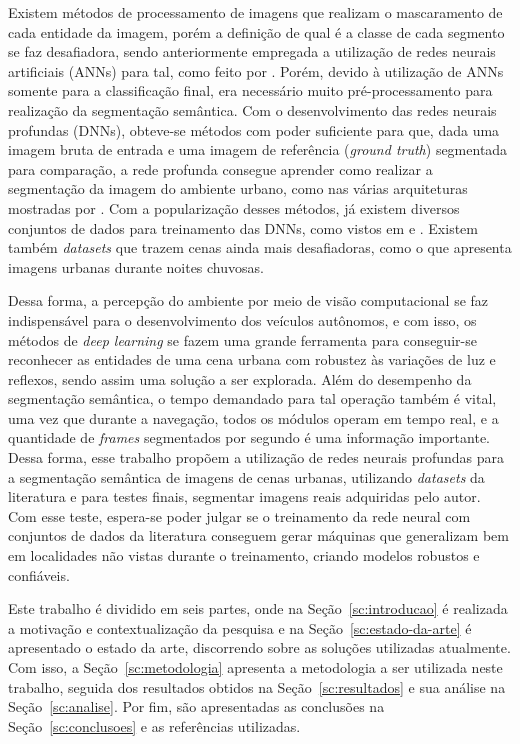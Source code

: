 \documentclass[conference]{IEEEtran}
\begin{document}
Existem métodos de processamento de imagens que realizam o mascaramento de cada entidade da imagem, porém a definição de qual é a classe de cada segmento se faz desafiadora, sendo anteriormente empregada a utilização de redes neurais artificiais (ANNs) para tal, como feito por \cite{vitor20132D3DVision}. Porém, devido à utilização de ANNs somente para a classificação final, era necessário muito pré-processamento para realização da segmentação semântica. Com o desenvolvimento das redes neurais profundas (DNNs), obteve-se métodos com poder suficiente para que, dada uma imagem bruta de entrada e uma imagem de referência (\textit{ground truth}) segmentada para comparação, a rede profunda consegue aprender como realizar a segmentação da imagem do ambiente urbano, como nas várias arquiteturas mostradas por \cite{papadeas2021RealTimeSemanticImage}. Com a popularização desses métodos, já existem diversos conjuntos de dados para treinamento das DNNs, como vistos em \cite{cordts2016CityscapesDatasetSemantic} e \cite{brostow2008SegmentationRecognitionUsing,brostow2009SemanticObjectClasses}. Existem também \textit{datasets} que trazem cenas ainda mais desafiadoras, como o \cite{jin2021RaidaRRichAnnotated} que apresenta imagens urbanas durante noites chuvosas.

Dessa forma, a percepção do ambiente por meio de visão computacional se faz indispensável para o desenvolvimento dos veículos autônomos, e com isso, os métodos de \textit{deep learning} se fazem uma grande ferramenta para conseguir-se reconhecer as entidades de uma cena urbana com robustez às variações de luz e reflexos, sendo assim uma solução a ser explorada. Além do desempenho da segmentação semântica, o tempo demandado para tal operação também é vital, uma vez que durante a navegação, todos os módulos operam em tempo real, e a quantidade de \textit{frames} segmentados por segundo é uma informação importante. Dessa forma, esse trabalho propõem a utilização de redes neurais profundas para a segmentação semântica de imagens de cenas urbanas, utilizando \textit{datasets} da literatura e para testes finais, segmentar imagens reais adquiridas pelo autor. Com esse teste, espera-se poder julgar se o treinamento da rede neural com conjuntos de dados da literatura conseguem gerar máquinas que generalizam bem em localidades não vistas durante o treinamento, criando modelos robustos e confiáveis.

Este trabalho é dividido em seis partes, onde na Seção~\ref{sc:introducao} é realizada a motivação e contextualização da pesquisa e na Seção~\ref{sc:estado-da-arte} é apresentado o estado da arte, discorrendo sobre as soluções utilizadas atualmente. Com isso, a Seção~\ref{sc:metodologia} apresenta a metodologia a ser utilizada neste trabalho, seguida dos resultados obtidos na Seção~\ref{sc:resultados} e sua análise na Seção~\ref{sc:analise}. Por fim, são apresentadas as conclusões na Seção~\ref{sc:conclusoes} e as referências utilizadas.
\end{document}
